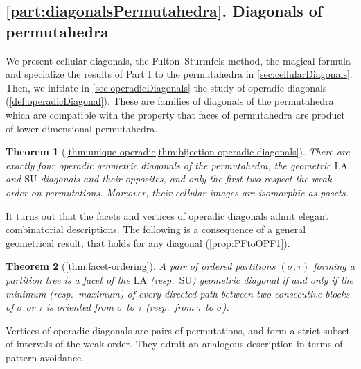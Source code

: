\documentclass{amsart}
\newtheorem*{theorem*}{Theorem}
\theoremstyle{definition}
\newcommand{\resp}{resp.~} %
\newcommand{\SU}{\mathrm{SU}}
\newcommand{\LA}{\mathrm{LA}}
\begin{document}

\subsection*{\cref{part:diagonalsPermutahedra}. Diagonals of permutahedra}

We present cellular diagonals, the Fulton--Sturmfels method, the magical formula and specialize the results of Part I to the permutahedra in \cref{sec:cellularDiagonals}.
Then, we initiate in \cref{sec:operadicDiagonals} the study of operadic diagonals (\cref{def:operadicDiagonal}).
These are families of diagonals of the permutahedra which are compatible with the property that faces of permutahedra are product of lower-dimensional permutahedra. 

\begin{theorem*}[\cref{thm:unique-operadic,thm:bijection-operadic-diagonals}]
There are exactly four operadic geometric diagonals of the permutahedra, the geometric $\LA$ and $\SU$ diagonals and their opposites, and only the first two respect the weak order on permutations.
Moreover, their cellular images are isomorphic as posets.
\end{theorem*}

It turns out that the facets and vertices of operadic diagonals admit elegant combinatorial descriptions. 
The following is a consequence of a general geometrical result, that holds for any diagonal (\cref{prop:PFtoOPF1}).

\begin{theorem*}[\cref{thm:facet-ordering}]
A pair of ordered partitions $(\sigma,\tau)$ forming a partition tree is a facet of the $\LA$ (\resp $\SU$) geometric diagonal if and only if the minimum (\resp maximum) of every directed path between two consecutive blocks of $\sigma$ or $\tau$ is oriented from $\sigma$ to $\tau$ (\resp from $\tau$ to $\sigma$).
\end{theorem*}

\pagebreak
Vertices of operadic diagonals are pairs of permutations, and form a strict subset of intervals of the weak order. 
They admit an analogous description in terms of pattern-avoidance. 
\end{document}
